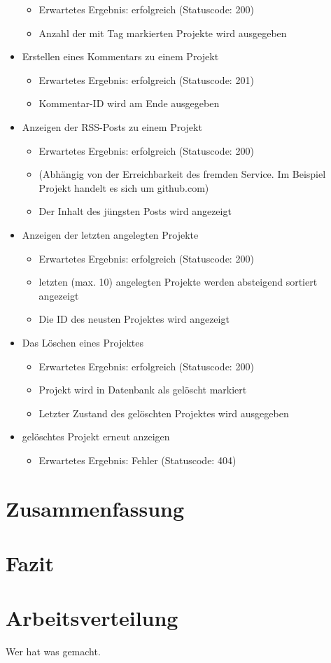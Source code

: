\documentclass[12pt]{scrartcl}
\begin{document}
\begin{itemize}
\begin{itemize}
					\item Erwartetes Ergebnis: erfolgreich (Statuscode: 200)
					\item Anzahl der mit Tag markierten Projekte wird ausgegeben
				\end{itemize}
				\item Erstellen eines Kommentars zu einem Projekt
				\begin{itemize}
					\item Erwartetes Ergebnis: erfolgreich (Statuscode: 201)
					\item Kommentar-ID wird am Ende ausgegeben
				\end{itemize}
				\item Anzeigen der RSS-Posts zu einem Projekt
				\begin{itemize}
					\item Erwartetes Ergebnis: erfolgreich (Statuscode: 200)
					\item (Abhängig von der Erreichbarkeit des fremden Service. Im Beispiel Projekt handelt es sich um github.com)
					\item Der Inhalt des jüngsten Posts wird angezeigt
				\end{itemize}
				\item Anzeigen der letzten angelegten Projekte
				\begin{itemize}
					\item Erwartetes Ergebnis: erfolgreich (Statuscode: 200)
					\item letzten (max. 10) angelegten Projekte werden absteigend sortiert angezeigt
					\item Die ID des neusten Projektes wird angezeigt
				\end{itemize}
				\item Das Löschen eines Projektes
				\begin{itemize}
					\item Erwartetes Ergebnis: erfolgreich (Statuscode: 200)
					\item Projekt wird in Datenbank als gelöscht markiert
					\item Letzter Zustand des gelöschten Projektes wird ausgegeben
				\end{itemize}
				\item gelöschtes Projekt erneut anzeigen
				\begin{itemize}
					\item Erwartetes Ergebnis: Fehler (Statuscode: 404)
				\end{itemize}
			\end{itemize}
		
	\section{Zusammenfassung}
	\section{Fazit}
	\section{Arbeitsverteilung}
		Wer hat was gemacht.
\end{document}
